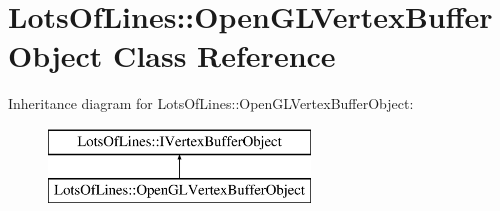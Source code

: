 \hypertarget{class_lots_of_lines_1_1_open_g_l_vertex_buffer_object}{}\section{Lots\+Of\+Lines\+:\+:Open\+G\+L\+Vertex\+Buffer\+Object Class Reference}
\label{class_lots_of_lines_1_1_open_g_l_vertex_buffer_object}
Inheritance diagram for Lots\+Of\+Lines\+:\+:Open\+G\+L\+Vertex\+Buffer\+Object\+:\begin{figure}[H]
\begin{center}
\leavevmode
\includegraphics[height=2.000000cm]{class_lots_of_lines_1_1_open_g_l_vertex_buffer_object}
\end{center}
\end{figure}
